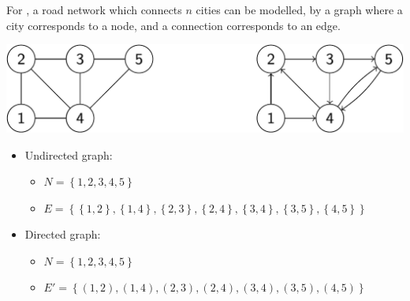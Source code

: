\highspace
\begin{examplebox}
    For , a road network which connects $n$ cities can be modelled, by a graph where a city corresponds to a node, and a connection corresponds to an edge.

    \begin{center}
        \includegraphics[width=.8\textwidth]{img/graphs-1.pdf}
    \end{center}

    \noindent
    \begin{itemize}
        \item Undirected graph:
        \begin{itemize}
            \item $N = \left\{1,2,3,4,5\right\}$
            \item $E = \left\{
                \left\{1,2\right\},
                \left\{1,4\right\},
                \left\{2,3\right\},
                \left\{2,4\right\},
                \left\{3,4\right\},
                \left\{3,5\right\},
                \left\{4,5\right\}
            \right\}$
        \end{itemize}
        
        \item Directed graph:
        \begin{itemize}
            \item $N = \left\{1,2,3,4,5\right\}$
            \item $E' = \left\{
                \left(1,2\right),
                \left(1,4\right),
                \left(2,3\right),
                \left(2,4\right),
                \left(3,4\right),
                \left(3,5\right),
                \left(4,5\right)
            \right\}$
        \end{itemize}
    \end{itemize}
\end{examplebox}

\newpage

